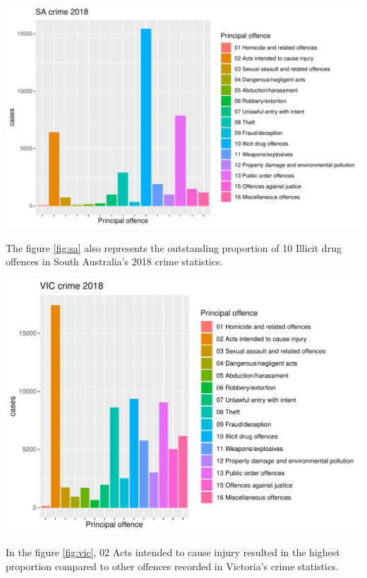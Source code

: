 \documentclass[11pt,a4paper,]{article}
\let\origfigure\figure
\let\endorigfigure\endfigure
\renewenvironment{figure}[1][2] {
\expandafter\origfigure\expandafter[H]
} {
\endorigfigure
}
\begin{document}
\begin{figure}
\centering
\includegraphics{ETC5513-Assignment4_files/figure-latex/sa-1.pdf}
\caption{\label{fig:sa}SA crime 2018}
\end{figure}

The figure \ref{fig:sa} also represents the outstanding proportion of 10 Illicit drug offences in South Australia's 2018 crime statistics.

\begin{figure}
\centering
\includegraphics{ETC5513-Assignment4_files/figure-latex/vic-1.pdf}
\caption{\label{fig:vic}VIC crime 2018}
\end{figure}

In the figure \ref{fig:vic}, 02 Acts intended to cause injury resulted in the highest proportion compared to other offences recorded in Victoria's crime statistics.
\end{document}

